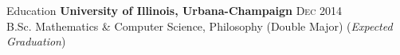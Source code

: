 \documentclass{resume} %
\begin{document}

\begin{rSection}{Education}
{\bf University of Illinois, Urbana-Champaign} \hfill { \textsc{Dec 2014}} \\ 
B.Sc. Mathematics \& Computer Science, Philosophy (Double Major) \hfill { \small{(\emph{Expected Graduation})} }
\end{rSection}

\end{document}
